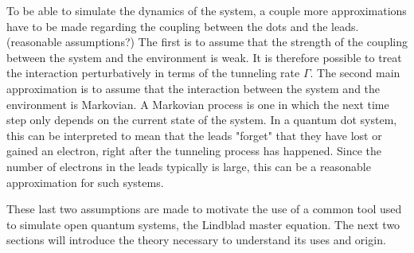 \documentclass[../main.tex]{subfiles}
\begin{document}
To be able to simulate the dynamics of the system, a couple more approximations have to be made regarding the coupling between the dots and the leads. (reasonable assumptions?) The first is to assume that the strength of the coupling between the system and the environment is weak. It is therefore possible to treat the interaction perturbatively in terms of the tunneling rate $\Gamma$. The second main approximation is to assume that the interaction between the system and the environment is Markovian. A Markovian process is one in which the next time step only depends on the current state of the system. In a quantum dot system, this can be interpreted to mean that the leads "forget" that they have lost or gained an electron, right after the tunneling process has happened. Since the number of electrons in the leads typically is large, this can be a reasonable approximation for such systems.

These last two assumptions are made to motivate the use of a common tool used to simulate open quantum systems, the Lindblad master equation. The next two sections will introduce the theory necessary to understand its uses and origin.
\end{document}
